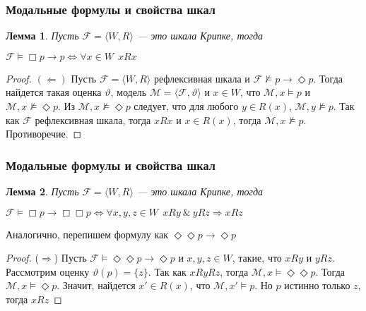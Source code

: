 \documentclass[pdf,utf8,russian,aspectratio=169]{beamer}
\newtheorem{lem}{Лемма}
\begin{document}
\begin{frame}
    \frametitle{Модальные формулы и свойства шкал}
    \begin{lem} Пусть $\mathcal{F} = \langle W, R \rangle$ --- это шкала Крипке, тогда

      $\mathcal{F} \models \Box p \to p \Leftrightarrow \forall x \in W \:\: x R x$
    \end{lem}

    \begin{proof}
      $(\Leftarrow)$ Пусть $\mathcal{F} = \langle W, R \rangle$ рефлексивная шкала и $\mathcal{F} \not\models p \to \Diamond p$.
      Тогда найдется такая оценка $\vartheta$, модель $\mathcal{M} = \langle \mathcal{F}, \vartheta \rangle$ и $x \in W$, что
      $\mathcal{M}, x \models p$ и $\mathcal{M}, x \not\models \Diamond p$. Из $\mathcal{M}, x \not\models \Diamond p$ следует, что для любого
      $y \in R(x)$, $\mathcal{M}, y \not\models p$. Так как $\mathcal{F}$ рефлексивная шкала, тогда $x R x$ и $x \in R(x)$, тогда $\mathcal{M}, x \not\models p$. Противоречие.
    \end{proof}
\end{frame}

\begin{frame}
  \frametitle{Модальные формулы и свойства шкал}

  \begin{lem} Пусть $\mathcal{F} = \langle W, R \rangle$ --- это шкала Крипке, тогда

    $\mathcal{F} \models \Box p \to \Box \Box p \Leftrightarrow \forall x, y, z \in W \:\: x R y \: \& \: y R z \Rightarrow x R z$
  \end{lem}

  Аналогично, перепишем формулу как $\Diamond \Diamond p \to \Diamond p$

\begin{proof}
  ($\Rightarrow$) Пусть $\mathcal{F} \models \Diamond \Diamond p \to \Diamond p$ и $x, y, z \in W$, такие, что $x R y$ и $y R z$. Рассмотрим оценку
  $\vartheta(p) = \{ z \}$. Так как $x R y R z$, тогда $\mathcal{M}, x \models \Diamond \Diamond p$. Тогда $\mathcal{M}, x \models \Diamond p$.
  Значит, найдется $x' \in R(x)$, что $\mathcal{M}, x' \models p$. Но $p$ истинно только $z$, тогда $x R z$
\end{proof}
\end{frame}
\end{document}

